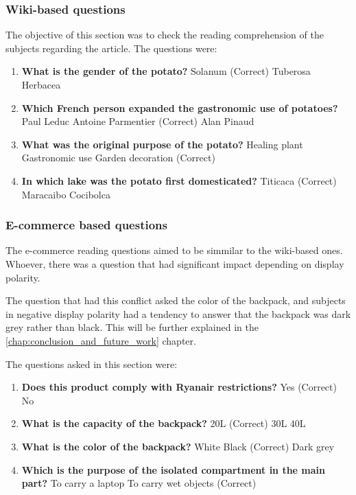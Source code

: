 \subsubsection{Wiki-based questions}
The objective of this section was to check the reading comprehension of the subjects regarding the article.
The questions were:
\begin{enumerate}
    \item \textbf{What is the gender of the potato?}
    \subitem Solanum (Correct)
    \subitem Tuberosa
    \subitem Herbacea
    \item \textbf{Which French person expanded the gastronomic use of potatoes?}
    \subitem Paul Leduc
    \subitem Antoine Parmentier (Correct)
    \subitem Alan Pinaud
    \item \textbf{What was the original purpose of the potato?}
    \subitem Healing plant
    \subitem Gastronomic use
    \subitem Garden decoration (Correct)
    \item \textbf{In which lake was the potato first domesticated?}
    \subitem Titicaca (Correct)
    \subitem Maracaibo
    \subitem Cocibolca
\end{enumerate} 
\subsubsection{E-commerce based questions}
The e-commerce reading questions aimed to be simmilar to the wiki-based ones. Whoever,
there was a question that had significant impact depending on display polarity.

The question that had this conflict asked the color of the backpack, and subjects in 
negative display polarity had a tendency to answer that the backpack was dark grey rather 
than black. This will be further explained in the \ref{chap:conclusion_and_future_work} chapter.

The questions asked in this section were:
\begin{enumerate}
    \item \textbf{Does this product comply with Ryanair restrictions?}
    \subitem Yes (Correct)
    \subitem No
    \item \textbf{What is the capacity of the backpack?}
    \subitem 20L (Correct)
    \subitem 30L
    \subitem 40L
    \item \textbf{What is the color of the backpack?}
    \subitem White
    \subitem Black (Correct)
    \subitem Dark grey
    \item \textbf{Which is the purpose of the isolated compartment in the main part?}
    \subitem To carry a laptop
    \subitem To carry wet objects (Correct)
\end{enumerate}
